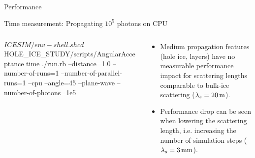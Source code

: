 
\begin{frame}[fragile]{Performance}

  Time measurement: Propagating $10^5$ photons on CPU \medskip

  \begin{columns}
    \begin{column}{0.7\textwidth}

      \begin{smallbash}
        $ICESIM/env-shell.sh
        cd $HOLE_ICE_STUDY/scripts/AngularAcceptance
        time ./run.rb --distance=1.0 --number-of-runs=1 --number-of-parallel-runs=1 --cpu --angle=45 --plane-wave --number-of-photons=1e5
      \end{smallbash}

    \end{column}
    \begin{column}{0.3\textwidth}
      \begin{itemize}
        \item Medium propagation features (hole ice, layers) have no measurable performance impact for scattering lengths comparable to bulk-ice scattering ($\lambda_s = 20\text{\,m}$).
        \item Performance drop can be seen when lowering the scattering length, i.e. increasing the number of simulation steps ($\lambda_s = 3\text{\,mm}$).
      \end{itemize}
    \end{column}
  \end{columns}


\end{frame}